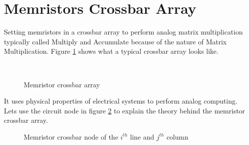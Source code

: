 \section{Memristors Crossbar Array}\label{sec:crossbar}

Setting memristors in a crossbar array to perform analog matrix multiplication typically called Multiply and Accumulate because of the nature of Matrix Multiplication. Figure \ref{fig:crossbar} shows what a typical crossbar array looks like.

\begin{figure}[H]
  \centering
  \hfill
  \\
  \caption{Memristor crossbar array}
  \label{fig:crossbar}
\end{figure}

It uses physical properties of electrical systems to perform analog computing. Lets use the circuit node in figure \ref{fig:crossNode} to explain the theory behind the memristor crossbar array.
\begin{figure}[H]
  \centering
  
  \caption{Memristor crossbar node of the $i^{th}$ line and $j^{th}$ column}
  \label{fig:crossNode}
\end{figure}

